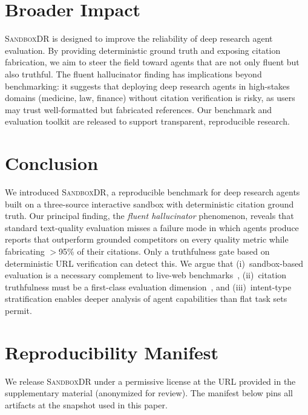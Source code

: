 \documentclass{article}
\newcommand{\ours}{\textsc{SandboxDR}}
\begin{document}
\section{Broader Impact}
\label{sec:impact}

\ours{} is designed to improve the reliability of deep research agent evaluation. By providing deterministic ground truth and exposing citation fabrication, we aim to steer the field toward agents that are not only fluent but also truthful. The fluent hallucinator finding has implications beyond benchmarking: it suggests that deploying deep research agents in high-stakes domains (medicine, law, finance) without citation verification is risky, as users may trust well-formatted but fabricated references. Our benchmark and evaluation toolkit are released to support transparent, reproducible research.

\section{Conclusion}
\label{sec:conclusion}

We introduced \ours{}, a reproducible benchmark for deep research agents built on a three-source interactive sandbox with deterministic citation ground truth. Our principal finding, the \emph{fluent hallucinator} phenomenon, reveals that standard text-quality evaluation misses a failure mode in which agents produce reports that outperform grounded competitors on every quality metric while fabricating $>$95\% of their citations. Only a truthfulness gate based on deterministic URL verification can detect this. We argue that (i)~sandbox-based evaluation is a necessary complement to live-web benchmarks~\citep{browsecomp_plus2025,deepresearchgym2025}, (ii)~citation truthfulness must be a first-class evaluation dimension~\citep{alce2023}, and (iii)~intent-type stratification enables deeper analysis of agent capabilities than flat task sets permit.



\appendix

\section{Reproducibility Manifest}
\label{sec:repro}

We release \ours{} under a permissive license at the URL provided in the supplementary material (anonymized for review). The manifest below pins all artifacts at the snapshot used in this paper.
\end{document}

